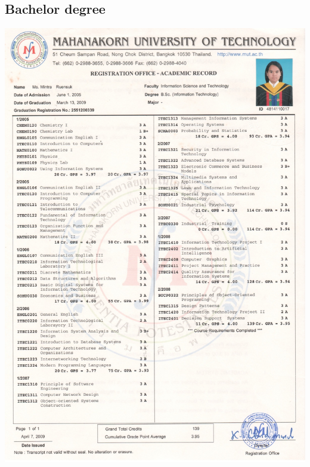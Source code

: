 \documentclass[11pt,a4paper,roman]{moderncv}        %
\begin{document}
\subsection{Bachelor degree}
\includegraphics[width=\textwidth]{images/bachelor_1}
\end{document}
